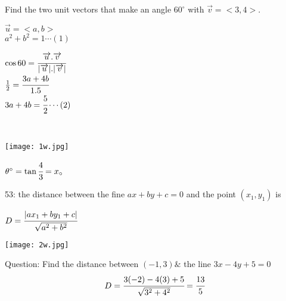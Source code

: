 \begin{example}
Find the two unit vectors that make an angle $60^\circ$ with $\overrightarrow{v}=<3,4>.$\\
\noindent\begin{minipage}{0.5\textwidth}
$\overrightarrow{u}=<a,b>$\\
$a^2+b^2=1\cdots(1)$\\
\end{minipage}
\noindent\begin{minipage}{0.5\textwidth}
$\cos{60}=\cfrac{\overrightarrow{u}.\overrightarrow{v}}{|\overrightarrow{u}|.|\overrightarrow{v}|}$\\
$\frac{1}{2}=\cfrac{3a+4b}{1.5}$\\
$3a+4b=\cfrac{5}{2}\cdots(2)$\\
\end{minipage}\\
\noindent\begin{minipage}{0.7\textwidth}
\texttt{[image: 1w.jpg]}\\
\end{minipage}
\noindent\begin{minipage}{0.5\textwidth}
$\theta^\circ=\tan\cfrac{4}{3}=x_\circ$\\
\end{minipage}
\end{example}
\noindent{\color{smalt(darkpowderblue)}\rule{\linewidth}{.2mm}}
53: the distance between the fine $ax+by+c=0$ and the point $(x_1,y_1)$ is\\
\noindent\begin{minipage}{0.5\textwidth}
$D=\cfrac{|ax_1+by_1+c|}{\sqrt{a^2+b^2}}$
\end{minipage}
\noindent\begin{minipage}{0.5\textwidth}
\texttt{[image: 2w.jpg]}
\end{minipage}
{\color{smalt(darkpowderblue)}Question:} Find the distance between $(-1,3)\&$ the line $3x-4y+5=0$
$$D=\cfrac{3(-2)-4(3)+5}{\sqrt{3^2+4^2}}=\cfrac{13}{5}$$
\noindent{\color{smalt(darkpowderblue)}\rule{\linewidth}{.2mm}}
